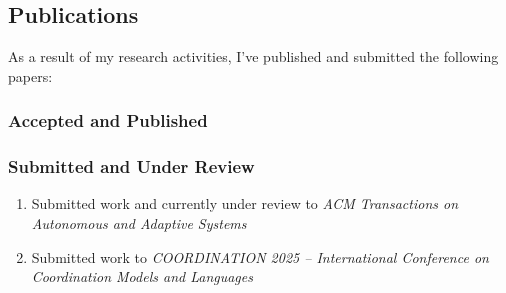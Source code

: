 \documentclass[runningheads]{llncs}
\begin{document}

\subsection{Publications}
\label{sec:publications}

As a result of my research activities,
I've published and submitted the following papers:

\subsubsection{Accepted and Published}
\begin{refsection}
    \nocite{*} %
    \printbibliography[heading=none]
\end{refsection}

\subsubsection{Submitted and Under Review}
\begin{enumerate}
    \item Submitted work and currently under review to \emph{ACM Transactions on Autonomous and Adaptive Systems}
    \item Submitted work to \emph{COORDINATION 2025 -- International Conference on Coordination Models and Languages}
\end{enumerate}

\end{document}
